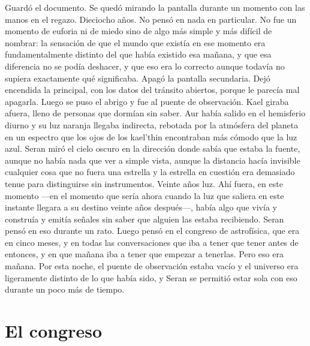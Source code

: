 \documentclass[11pt,a5paper,twoside]{book}
\begin{document}
Guardó el documento.
Se quedó mirando la pantalla durante un momento con las manos en el regazo.
Dieciocho años.
No pensó en nada en particular. No fue un momento de euforia ni de miedo sino de algo más simple y más difícil de nombrar: la sensación de que el mundo que existía en ese momento era fundamentalmente distinto del que había existido esa mañana, y que esa diferencia no se podía deshacer, y que eso era lo correcto aunque todavía no supiera exactamente qué significaba.
Apagó la pantalla secundaria. Dejó encendida la principal, con los datos del tránsito abiertos, porque le parecía mal apagarla.
Luego se puso el abrigo y fue al puente de observación.
Kael giraba afuera, lleno de personas que dormían sin saber. Aur había salido en el hemisferio diurno y su luz naranja llegaba indirecta, rebotada por la atmósfera del planeta en un espectro que los ojos de los kael'thin encontraban más cómodo que la luz azul. Seran miró el cielo oscuro en la dirección donde sabía que estaba la fuente, aunque no había nada que ver a simple vista, aunque la distancia hacía invisible cualquier cosa que no fuera una estrella y la estrella en cuestión era demasiado tenue para distinguirse sin instrumentos.
Veinte años luz.
Ahí fuera, en este momento —en el momento que sería ahora cuando la luz que saliera en este instante llegara a su destino veinte años después—, había algo que vivía y construía y emitía señales sin saber que alguien las estaba recibiendo.
Seran pensó en eso durante un rato.
Luego pensó en el congreso de astrofísica, que era en cinco meses, y en todas las conversaciones que iba a tener que tener antes de entonces, y en que mañana iba a tener que empezar a tenerlas.
Pero eso era mañana.
Por esta noche, el puente de observación estaba vacío y el universo era ligeramente distinto de lo que había sido, y Seran se permitió estar sola con eso durante un poco más de tiempo.

\chapter{El congreso}
\end{document}
